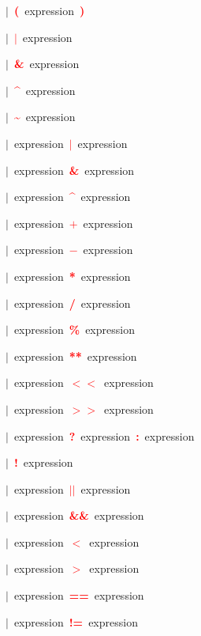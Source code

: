 \mbox{$|$ \textbf{\textcolor{red}{(}} expression \textbf{\textcolor{red}{)}}}

\mbox{$|$ \textbf{\textcolor{red}{$|$}} expression}

\mbox{$|$ \textbf{\textcolor{red}{\textbf{\textcolor{red}{\&}}}} expression}

\mbox{$|$ \textbf{\textcolor{red}{\^{}}} expression}

\mbox{$|$ \textbf{\textcolor{red}{\~{}}} expression}

\mbox{$|$ expression \textbf{\textcolor{red}{$|$}} expression}

\mbox{$|$ expression \textbf{\textcolor{red}{\textbf{\textcolor{red}{\&}}}} expression}

\mbox{$|$ expression \textbf{\textcolor{red}{\^{}}} expression}

\mbox{$|$ expression \textbf{\textcolor{red}{$+$}} expression}

\mbox{$|$ expression \textbf{\textcolor{red}{$-$}} expression}

\mbox{$|$ expression \textbf{\textcolor{red}{*}} expression}

\mbox{$|$ expression \textbf{\textcolor{red}{/}} expression}

\mbox{$|$ expression \textbf{\textcolor{red}{\textbf{\textcolor{red}{\%}}}} expression}

\mbox{$|$ expression \textbf{\textcolor{red}{**}} expression}

\mbox{$|$ expression \textbf{\textcolor{red}{$<$$<$}} expression}

\mbox{$|$ expression \textbf{\textcolor{red}{$>$$>$}} expression}

\mbox{$|$ expression \textbf{\textcolor{red}{?}} expression \textbf{\textcolor{red}{:}} expression}

\mbox{$|$ \textbf{\textcolor{red}{!}} expression}

\mbox{$|$ expression \textbf{\textcolor{red}{$|$$|$}} expression}

\mbox{$|$ expression \textbf{\textcolor{red}{\textbf{\textcolor{red}{\&}}\textbf{\textcolor{red}{\&}}}} expression}

\mbox{$|$ expression \textbf{\textcolor{red}{$<$}} expression}

\mbox{$|$ expression \textbf{\textcolor{red}{$>$}} expression}

\mbox{$|$ expression \textbf{\textcolor{red}{==}} expression}

\mbox{$|$ expression \textbf{\textcolor{red}{!=}} expression}

